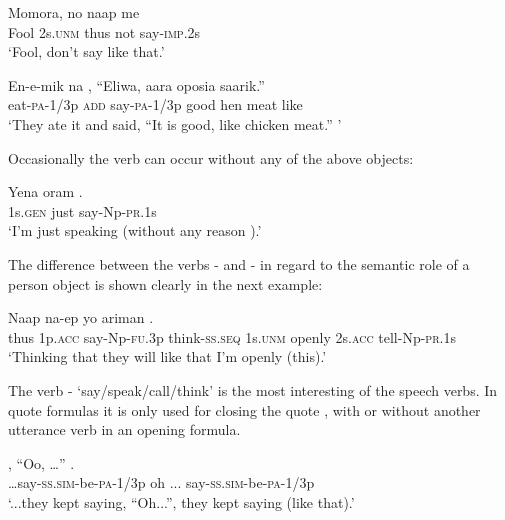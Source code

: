 \ea%
\label{ex:3:x319}
\gll Momora, no naap me  \\
Fool 2s.\textsc{unm} thus not say-\textsc{imp}.2s \\
\glt`Fool, don't say like that.'
\z

\ea%
\label{ex:3:x320}
\gll En-e-mik na{\footnotemark} , ``Eliwa, aara oposia saarik.'' \\
eat-\textsc{pa}-1/3p \textsc{add} say-\textsc{pa}-1/3p good hen meat like\\
\glt`They ate it and said, ``It is good, like chicken meat.'' '
\z


Occasionally the verb can occur without any of the above objects:

\ea%
\label{ex:3:x321}
\gll Yena oram . \\
1s.\textsc{gen} just say-Np-\textsc{pr}.1s \\
\glt`I'm just speaking (without any reason ).'
\z

The difference between the verbs - and - in regard to the semantic role of a person object is shown clearly in the next example:

\ea%
\label{ex:3:x322}
\gll Naap   na-ep yo ariman   .
\\
thus 1p.\textsc{acc} say-Np-\textsc{fu}.3p think-\textsc{ss}.\textsc{seq} 1s.\textsc{unm} openly 2s.\textsc{acc} tell-Np-\textsc{pr}.1s\\
\glt`Thinking that they will  like that  I'm openly  (this).'
\z

The verb - `say/speak/call/think' is the most interesting of the speech verbs. In quote formulas it is only used for closing the quote , with or without another utterance verb in an opening formula.

\ea%
\label{ex:3:x323}
\gll {\dots}, ``Oo, {\dots}'' . \\
{\dots}say-\textsc{ss}.\textsc{sim}-be-\textsc{pa}-1/3p oh ... say-\textsc{ss}.\textsc{sim}-be-\textsc{pa}-1/3p \\
\glt`...they kept saying, ``Oh...'', they kept saying (like that).'
\z

